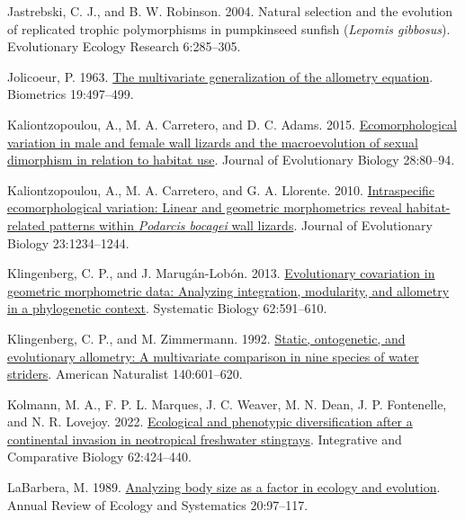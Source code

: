 \documentclass[
  11pt,
]{article}
\newlength{\cslhangindent}
\newlength{\cslentryspacingunit} %
\newenvironment{CSLReferences}[2] %
 {%
  \setlength{\parindent}{0pt}
  \ifodd #1
  \let\oldpar\par
  \def\par{\hangindent=\cslhangindent\oldpar}
  \fi
  \setlength{\parskip}{#2\cslentryspacingunit}
 }%
 {}
\begin{document}
\begin{CSLReferences}{1}{0}
\leavevmode{}%
Jastrebski, C. J., and B. W. Robinson. 2004. Natural selection and the
evolution of replicated trophic polymorphisms in pumpkinseed sunfish
(\emph{{L}epomis gibbosus}). Evolutionary Ecology Research 6:285--305.

\leavevmode{}%
Jolicoeur, P. 1963. \href{https://doi.org/10.2307/2527939}{The
multivariate generalization of the allometry equation}. Biometrics
19:497--499.

\leavevmode{}%
Kaliontzopoulou, A., M. A. Carretero, and D. C. Adams. 2015.
\href{https://doi.org/10.1111/jeb.12540}{Ecomorphological variation in
male and female wall lizards and the macroevolution of sexual dimorphism
in relation to habitat use}. Journal of Evolutionary Biology 28:80--94.

\leavevmode{}%
Kaliontzopoulou, A., M. A. Carretero, and G. A. Llorente. 2010.
\href{https://doi.org/10.1111/j.1420-9101.2010.01984.x}{Intraspecific
ecomorphological variation: Linear and geometric morphometrics reveal
habitat-related patterns within \emph{{P}odarcis bocagei} wall lizards}.
Journal of Evolutionary Biology 23:1234--1244.

\leavevmode{}%
Klingenberg, C. P., and J. Marugán-Lobón. 2013.
\href{https://doi.org/10.1093/sysbio/syt025}{Evolutionary covariation in
geometric morphometric data: Analyzing integration, modularity, and
allometry in a phylogenetic context}. Systematic Biology 62:591--610.

\leavevmode{}%
Klingenberg, C. P., and M. Zimmermann. 1992.
\href{https://doi.org/10.1086/285430}{Static, ontogenetic, and
evolutionary allometry: A multivariate comparison in nine species of
water striders}. American Naturalist 140:601--620.

\leavevmode{}%
Kolmann, M. A., F. P. L. Marques, J. C. Weaver, M. N. Dean, J. P.
Fontenelle, and N. R. Lovejoy. 2022.
\href{https://doi.org/10.1093/icb/icac019}{Ecological and phenotypic
diversification after a continental invasion in neotropical freshwater
stingrays}. Integrative and Comparative Biology 62:424--440.

\leavevmode{}%
LaBarbera, M. 1989.
\href{https://doi.org/10.1146/annurev.es.20.110189.000525}{Analyzing
body size as a factor in ecology and evolution}. Annual Review of
Ecology and Systematics 20:97--117.


\end{CSLReferences}
\end{document}
